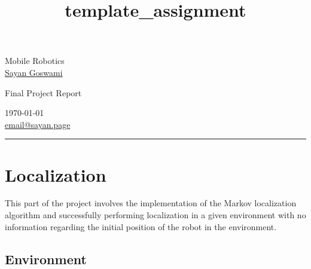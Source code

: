 \documentclass[a4paper,10pt]{article} %
\begin{document}

\title{template_assignment} %
\fancyhead[C]{}

\begin{minipage}{0.295\textwidth} %
\raggedright
Mobile Robotics\\ %
\footnotesize %
\href{https://sayan.page}{Sayan Goswami} %
\medskip %
\end{minipage}
\begin{minipage}{0.4\textwidth} %
\centering
\large %
Final Project Report\\ %
\end{minipage}
\begin{minipage}{0.295\textwidth} %
\raggedleft
\today\\ %
\footnotesize %
\href{mailto:email@sayan.page}{email@sayan.page}%
\medskip %
\end{minipage}
\hrule


\section{Localization}

This part of the project involves the implementation of the Markov localization algorithm and  successfully performing localization in a given environment with no information regarding the initial position of the robot in the environment.

\subsection{Environment}
\end{document}
